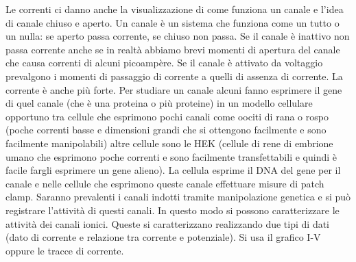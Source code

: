 \documentclass[]{article}
\begin{document}
Le correnti ci danno anche la visualizzazione di come funziona un canale
e l'idea di canale chiuso e aperto. Un canale è un sistema che funziona
come un tutto o un nulla: se aperto passa corrente, se chiuso non passa.
Se il canale è inattivo non passa corrente anche se in realtà abbiamo
brevi momenti di apertura del canale che causa correnti di alcuni
picoampère. Se il canale è attivato da voltaggio prevalgono i momenti di
passaggio di corrente a quelli di assenza di corrente. La corrente è
anche più forte. Per studiare un canale alcuni fanno esprimere il gene
di quel canale (che è una proteina o più proteine) in un modello
cellulare opportuno tra cellule che esprimono pochi canali come oociti
di rana o rospo (poche correnti basse e dimensioni grandi che si
ottengono facilmente e sono facilmente manipolabili) altre cellule sono
le HEK (cellule di rene di embrione umano che esprimono poche correnti e
sono facilmente transfettabili e quindi è facile fargli esprimere un
gene alieno). La cellula esprime il DNA del gene per il canale e nelle
cellule che esprimono queste canale effettuare misure di patch clamp.
Saranno prevalenti i canali indotti tramite manipolazione genetica e si
può registrare l'attività di questi canali. In questo modo si possono
caratterizzare le attività dei canali ionici. Queste si caratterizzano
realizzando due tipi di dati (dato di corrente e relazione tra corrente
e potenziale). Si usa il grafico I-V oppure le tracce di corrente.
\end{document}
